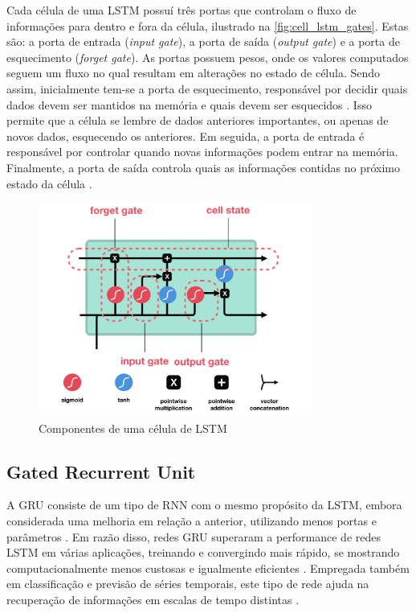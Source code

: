 Cada célula de uma LSTM possuí três portas que controlam o fluxo de informações para dentro e fora da célula, ilustrado na \autoref{fig:cell_lstm_gates}. Estas são: a porta de entrada (\textit{input gate}), a porta de saída (\textit{output gate}) e a porta de esquecimento (\textit{forget gate}). As portas possuem pesos, onde os valores computados seguem um fluxo no qual resultam em alterações no estado de célula. Sendo assim, inicialmente tem-se a porta de esquecimento, responsável por decidir quais dados devem ser mantidos na memória e quais devem ser esquecidos \cite{Phi2020}. Isso permite que a célula se lembre de dados anteriores importantes, ou apenas de novos dados, esquecendo os anteriores. Em seguida, a porta de entrada é responsável por controlar quando novas informações podem entrar na memória. Finalmente, a porta de saída controla quais as informações contidas no próximo estado da célula \cite{Jones2017}.

\begin{figure}[h]
  \centering
  \caption{Componentes de uma célula de LSTM}
   \label{fig:cell_lstm_gates}
   \includegraphics[width=0.8\textwidth]{figuras/fig_9.png}
\end{figure}

\subsection{Gated Recurrent Unit}

A GRU consiste de um tipo de RNN com o mesmo propósito da LSTM, embora considerada uma melhoria em relação a anterior, utilizando menos portas e parâmetros \cite{Kumar2019,Bianchi2017}. Em razão disso, redes GRU superaram a performance de redes LSTM em várias aplicações, treinando e convergindo mais rápido, se mostrando computacionalmente menos custosas e igualmente eficientes \cite{Kumar2019,Bianchi2017}. Empregada também em classificação e previsão de séries temporais, este tipo de rede ajuda na recuperação de informações em escalas de tempo distintas \cite{Bianchi2017,Kumar2019}. 

